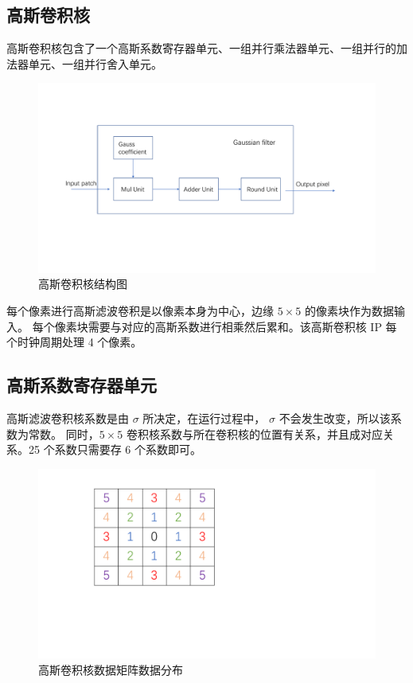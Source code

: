 \documentclass[12pt, a4paper, oneside]{ctexbook}
\begin{document}
	\subsection{高斯卷积核}
	高斯卷积核包含了一个高斯系数寄存器单元、一组并行乘法器单元、一组并行的加法器单元、一组并行舍入单元。
		\begin{figure}[h]
			\centering
			\includegraphics[scale=0.55]{pic/gaussian_filter}
			\caption{高斯卷积核结构图}
			\label{fig:gaussianfilter}
		\end{figure}
	每个像素进行高斯滤波卷积是以像素本身为中心，边缘 $5\times5$ 的像素块作为数据输入。
	每个像素块需要与对应的高斯系数进行相乘然后累和。该高斯卷积核 IP 每个时钟周期处理 4 个像素。
	\subsection{高斯系数寄存器单元}
	高斯滤波卷积核系数是由 $\sigma$ 所决定，在运行过程中， $\sigma$ 不会发生改变，所以该系数为常数。
	同时，$5\times5$ 卷积核系数与所在卷积核的位置有关系，并且成对应关系。25 个系数只需要存 6 个系数即可。
	\begin{figure}[h]
		\centering
		\includegraphics[scale=0.4]{pic/number}
		\caption{高斯卷积核数据矩阵数据分布}
		\label{fig:number}
	\end{figure}
\end{document}
